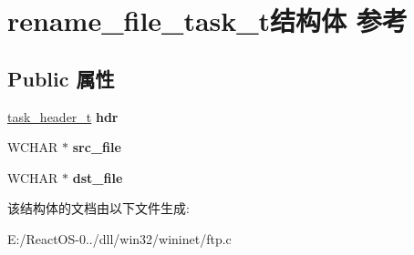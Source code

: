 \hypertarget{structrename__file__task__t}{}\section{rename\+\_\+file\+\_\+task\+\_\+t结构体 参考}
\label{structrename__file__task__t}
\subsection*{Public 属性}
\begin{DoxyCompactItemize}
\item 
\mbox{\label{structrename__file__task__t_a1dbff6e4ba40b929bed30c298c19ed99}} 
\hyperlink{structtask__header__t}{task\+\_\+header\+\_\+t} {\bfseries hdr}
\item 
\mbox{\label{structrename__file__task__t_a7172e6567798d15d32aa27e07838b750}} 
W\+C\+H\+AR $\ast$ {\bfseries src\+\_\+file}
\item 
\mbox{\label{structrename__file__task__t_a0bcfa2d8ad8f88ee23484fd6f8cfc1f3}} 
W\+C\+H\+AR $\ast$ {\bfseries dst\+\_\+file}
\end{DoxyCompactItemize}


该结构体的文档由以下文件生成\+:\begin{DoxyCompactItemize}
\item 
E\+:/\+React\+O\+S-\/0../dll/win32/wininet/ftp.\+c\end{DoxyCompactItemize}
